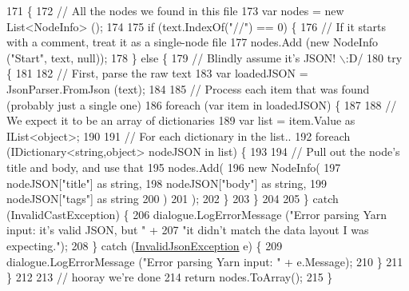 \begin{DoxyCode}
171         \{
172             \textcolor{comment}{// All the nodes we found in this file}
173             var nodes = \textcolor{keyword}{new} List<NodeInfo> ();
174 
175             \textcolor{keywordflow}{if} (text.IndexOf(\textcolor{stringliteral}{"//"}) == 0) \{
176                 \textcolor{comment}{// If it starts with a comment, treat it as a single-node file}
177                 nodes.Add (\textcolor{keyword}{new} NodeInfo (\textcolor{stringliteral}{"Start"}, text, null));
178             \} \textcolor{keywordflow}{else} \{
179                 \textcolor{comment}{// Blindly assume it's JSON! \(\backslash\):D/}
180                 \textcolor{keywordflow}{try} \{
181 
182                     \textcolor{comment}{// First, parse the raw text}
183                     var loadedJSON = JsonParser.FromJson (text);
184 
185                     \textcolor{comment}{// Process each item that was found (probably just a single one)}
186                     \textcolor{keywordflow}{foreach} (var item \textcolor{keywordflow}{in} loadedJSON) \{
187 
188                         \textcolor{comment}{// We expect it to be an array of dictionaries}
189                         var list = item.Value as IList<object>;
190 
191                         \textcolor{comment}{// For each dictionary in the list..}
192                         \textcolor{keywordflow}{foreach} (IDictionary<string,object> nodeJSON \textcolor{keywordflow}{in} list) \{
193 
194                             \textcolor{comment}{// Pull out the node's title and body, and use that}
195                             nodes.Add(
196                                 \textcolor{keyword}{new} NodeInfo(
197                                     nodeJSON[\textcolor{stringliteral}{"title"}] as \textcolor{keywordtype}{string}, 
198                                     nodeJSON[\textcolor{stringliteral}{"body"}] as \textcolor{keywordtype}{string},
199                                     nodeJSON[\textcolor{stringliteral}{"tags"}] as \textcolor{keywordtype}{string}
200                                 )
201                             );
202                         \}
203                     \}
204 
205                 \} \textcolor{keywordflow}{catch} (InvalidCastException) \{
206                     dialogue.LogErrorMessage (\textcolor{stringliteral}{"Error parsing Yarn input: it's valid JSON, but "} +
207                         \textcolor{stringliteral}{"it didn't match the data layout I was expecting."});
208                 \} \textcolor{keywordflow}{catch} (\hyperlink{a00045}{InvalidJsonException} e) \{
209                     dialogue.LogErrorMessage (\textcolor{stringliteral}{"Error parsing Yarn input: "} + e.Message);
210                 \}
211             \}
212 
213             \textcolor{comment}{// hooray we're done}
214             \textcolor{keywordflow}{return} nodes.ToArray();
215         \}
\end{DoxyCode}

